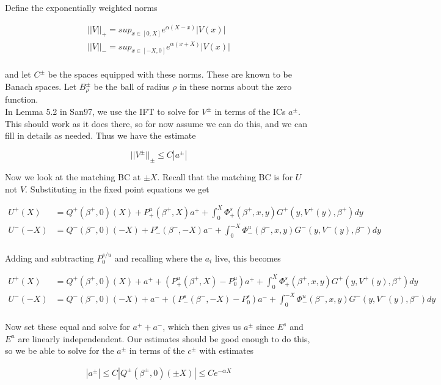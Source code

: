\documentclass[12pt]{article}
\begin{document}
Define the exponentially weighted norms

\begin{align*}
||V||_+ = sup_{x \in [0, X]} e^{\alpha(X - x)}|V(x)| \\
||V||_- = sup_{x \in [-X, 0]} e^{\alpha(x + X)}|V(x)| \\
\end{align*}

and let $C^\pm$ be the spaces equipped with these norms. These are known to be Banach spaces. Let $B_\rho^\pm$ be the ball of radius $\rho$ in these norms about the zero function.\\

In Lemma 5.2 in San97, we use the IFT to solve for $V^\pm$ in terms of the ICs $a^\pm$. This should work as it does there, so for now assume we can do this, and we can fill in details as needed. Thus we have the estimate

\[
||V^\pm||_\pm \leq C |a^\pm|
\]

Now we look at the matching BC at $\pm X$. Recall that the matching BC is for $U$ not $V$. Substituting in the fixed point equations we get

\begin{align*}
U^+(X) &= Q^+(\beta^+, 0)(X) + P^u_+(\beta^+, X) a^+ + \int_0^X \Phi_+^s(\beta^+, x, y) G^+(y, V^+(y),\beta^+)dy \\ 
U^-(-X) &= Q^-(\beta^-, 0)(-X) + P^s_-(\beta^-, -X) a^- + \int_0^{-X} \Phi_-^u(\beta^-, x, y) G^-(y, V^-(y),\beta^-)dy \\
\end{align*}

Adding and subtracting $P_0^{s/u}$ and recalling where the $a_i$ live, this becomes

\begin{align*}
U^+(X) &= Q^+(\beta^+, 0)(X) + a^+ + (P^u_+(\beta^+, X) - P^u_0) a^+ + \int_0^X \Phi_+^s(\beta^+, x, y) G^+(y, V^+(y),\beta^+)dy \\ 
U^-(-X) &= Q^-(\beta^-, 0)(-X) + a^- + (P^s_-(\beta^-, -X) - P^s_0) a^- + \int_0^{-X} \Phi_-^u(\beta^-, x, y) G^-(y, V^-(y),\beta^-)dy \\
\end{align*}

Now set these equal and solve for $a^+ + a^-$, which then gives us $a^\pm$ since $E^s$ and $E^u$ are linearly independendent. Our estimates should be good enough to do this, so we be able to solve for the $a^\pm$ in terms of the $c^\pm$ with estimates

\begin{align*}
|a^\pm| \leq C |Q^\pm(\beta^\pm, 0)(\pm X)| \leq C e^{-\alpha X}
\end{align*}
\end{document}

